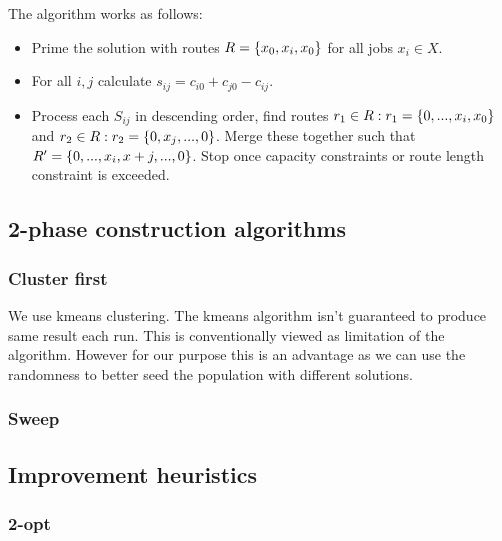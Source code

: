 The algorithm works as follows:

\begin{itemize}
	\item Prime the solution with routes $R = \{x_0, x_i, x_0\}$ for all jobs $x_i \in X$.
	\item For all $i,j$ calculate $s_{ij} = c_{i0} + c_{j0} - c_{ij}$.
	\item Process each $S_{ij}$ in descending order, find routes $r_1 \in R : r_1 = \{0,...,x_i,x_0\}$ and $r_2 \in R: r_2 = \{0,x_j,...,0\}$. Merge these together such that $R' = \{0,...,x_i, x+j,...,0\}$. Stop once capacity constraints or route length constraint is exceeded.
\end{itemize}



\subsection{2-phase construction algorithms}
\label{2phasealgorithms}

\subsubsection{Cluster first}

We use kmeans clustering. The kmeans algorithm isn't guaranteed to produce same result each run. This is conventionally viewed as limitation of the algorithm. However for our purpose this is an advantage as we can use the randomness to better seed the population with different solutions.  

\subsubsection{Sweep}


\subsection{Improvement heuristics}

\subsubsection{2-opt}

